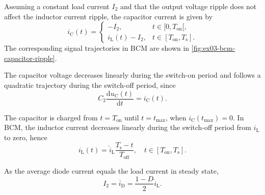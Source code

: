 \begin{solutionblock}
	Assuming a constant load current $I_2$ and that the output
	voltage ripple does not affect the inductor current ripple,
	the capacitor current is given by
	\begin{equation}
		i_\mathrm{C}(t) = \begin{cases}
			-I_2, & t\in [0,T_\mathrm{on}[,            \\
			i_\mathrm{L}(t)-I_2,
			      & t\in [T_\mathrm{on},T_\mathrm{s}].
		\end{cases}
	\end{equation}
	The corresponding signal trajectories in BCM are shown in
	\autoref{fig:ex03-bcm-capacitor-ripple}.

	

	The capacitor voltage decreases linearly during the switch-on
	period and follows a quadratic trajectory during the switch-off
	period, since
	\begin{equation}
		C_2\frac{\mathrm{d}u_\mathrm{C}(t)}{\mathrm{d}t}
		=i_\mathrm{C}(t).
	\end{equation}

	The capacitor is charged from $t=T_\mathrm{on}$ until
	$t=t_\mathrm{max}$, when $i_\mathrm{C}(t_\mathrm{max})=0$.
	In BCM, the inductor current decreases linearly during the
	switch-off period from $\hat{i}_\mathrm{L}$
	to zero, hence
	\begin{equation}
		i_\mathrm{L}(t)=
		\hat{i}_\mathrm{L}\frac{T_\mathrm{s}-t}{T_\mathrm{off}},
		\quad t\in [T_\mathrm{on},T_\mathrm{s}].
	\end{equation}

	As the average diode current equals the load current in
	steady state,
	\begin{equation}
		I_2=\overline{i}_\mathrm{D}
		=\frac{1-D}{2}\hat{i}_\mathrm{L}.
	\end{equation}


\end{solutionblock}
